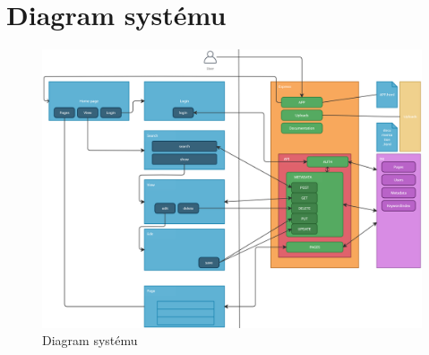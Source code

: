 \section{Diagram systému}
\begin{figure}[H]
	\centering
	\includegraphics[angle=90,origin=c,width=\linewidth]{img/diagram.png}
	\caption{Diagram systému}
\end{figure}
